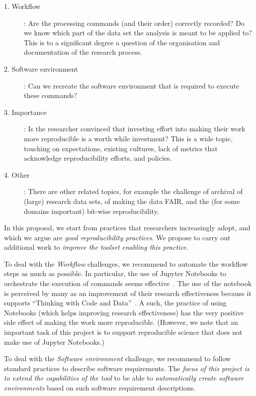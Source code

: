 \begin{description}
\item[1. Workflow]: Are the processing commands (and their order)
correctly recorded? Do we know which part of the data set the analysis is meant
to be applied to? This is to a significant degree a question of the organisation
and documentation of the research process.

\item[2. Software environment]: Can we recreate the software environment that is
required to execute these commands?

\item[3. Importance]: Is the researcher convinced that investing effort into making
their work more reproducible is a worth while investment? This is a wide topic,
touching on expectations, existing cultures, lack of metrics that acknowledge
reproducibility efforts, and policies.

\item[4. Other]: There are other related topics, for example the challenge of
archival of (large) research data sets, of making the data FAIR, and the (for
some domains important) bit-wise reproducibility.
\end{description}

In this proposal, we start from practices that researchers increasingly adopt,
and which we argue are \emph{good reproducibility practices}. We propose to carry
out additional work to \emph{improve the toolset enabling this practice}.

To deal with the \emph{Workflow} challenges, we recommend to automate the
workflow steps as much as possible. In particular, the use of Jupyter Notebooks
to orchestrate the execution of commands seems effective~\cite{Beg2021}.
The use of the notebook is
perceived by many as an improvement of their research effectiveness because
it supports ``Thinking with Code and Data''~\cite{Granger2021}. A such, the
practice of using Notebooks (which helps improving research effectiveness) has
the very positive side effect of making the work more reproducible. (However, we
note that an important task of this project is to support reproducible science
that does not make use of Jupyter Notebooks.)

To deal with the \emph{Software environment} challenge, we recommend to follow
standard practices to describe software requirements. The \emph{focus of this
project is to extend the capabilities of the \repotodocker{} tool} to be able to
\emph{automatically create software environments} based on such software
requirement descriptions.

